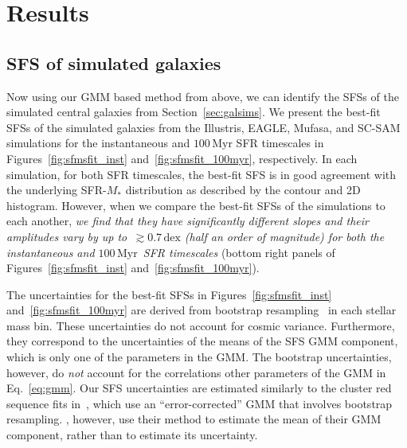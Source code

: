\documentclass[tighten, preprint]{aastex62}
\newcommand{\hunmyr}{$100\,\mathrm{Myr}$}
\begin{document}
\section{Results} \label{sec:results}
\subsection{SFS of simulated galaxies} \label{sec:sfs}
Now using our GMM based method from above, %
we can identify the SFSs of the simulated central galaxies from 
Section~\ref{sec:galsims}. We present the best-fit SFSs of the 
simulated galaxies from the Illustris, EAGLE, {\sc Mufasa}, and SC-SAM 
simulations for the instantaneous and $100\,\mathrm{Myr}$ SFR 
timescales in Figures~\ref{fig:sfmsfit_inst} and~\ref{fig:sfmsfit_100myr}, 
respectively. 
{\color{red} 
In each simulation, for both SFR timescales, the best-fit SFS is 
in good agreement with the underlying SFR-$M_*$ distribution as described 
by the contour and 2D histogram. However, when we compare the best-fit SFSs 
of the simulations to each another, \emph{we find that they have significantly 
different slopes and their amplitudes vary by up to $\,\gtrsim 0.7\,\mathrm{dex}$ 
(half an order of magnitude) for both the instantaneous and \hunmyr~SFR timescales}} 
(bottom right panels of Figures~\ref{fig:sfmsfit_inst} and~\ref{fig:sfmsfit_100myr}).

The uncertainties for the best-fit SFSs in Figures~\ref{fig:sfmsfit_inst} 
and~\ref{fig:sfmsfit_100myr} are derived from bootstrap resampling~\citep{efron1979} 
in each stellar mass bin. 
{\color{red}
These uncertainties do not account for cosmic 
variance. %
Furthermore, they correspond to the uncertainties of the means of 
the SFS GMM component, which is only one of the parameters in the GMM. 
The bootstrap uncertainties, however, do}
\emph{not} account for the correlations other parameters of the GMM in Eq.~\ref{eq:gmm}. 
{\color{red} 
Our SFS uncertainties are estimated 
similarly to the cluster red sequence fits in~\cite{hao2009}, which use an 
``error-corrected'' GMM that involves bootstrap resampling. \cite{hao2009}, 
however, use their method to estimate the mean of their GMM component, 
rather than to estimate its uncertainty.
}
\end{document}
